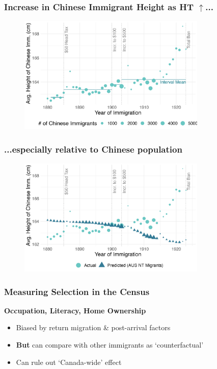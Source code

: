 \documentclass[xcolor=dvipsnames, compress, 12pt, aspectratio=169, handout]{beamer}
\begin{document}
\begin{frame}
    \frametitle{Increase in Chinese Immigrant Height as HT $\uparrow$...}
    \begin{figure}
        \includegraphics[width = 0.8\textwidth]{../../figs/slides/height_selection.png}
    \end{figure}
\end{frame}

\begin{frame}
    \label{height2}
    \frametitle{...especially relative to Chinese population \hyperlink{baten_graph}{}}
    \begin{figure}
        \includegraphics[width = 0.8\textwidth]{../../figs/slides/height_compare_selection.png}
    \end{figure}
\end{frame}

\begin{frame}
    \frametitle{Measuring Selection in the Census}
    \textbf{Occupation, Literacy, Home Ownership} \vspace{2mm}
    \begin{itemize}
        \item Biased by return migration \& post-arrival factors \vspace{2mm}
        \item \textbf{But} can compare with other immigrants as `counterfactual'  \vspace{2mm}
        \item Can rule out `Canada-wide' effect 
    \end{itemize}
\end{frame}
\end{document}
